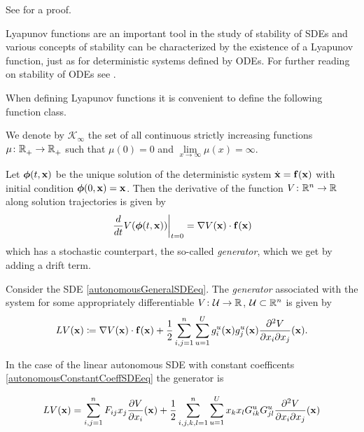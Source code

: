 \documentclass[a4paper,12pt,twoside,BCOR=10mm]{scrbook}
\begin{document}
See \citep{HGGS2018localLya} for a proof.

Lyapunov functions are an important tool in the study of stability of SDEs and various concepts of stability can be characterized by the existence of a Lyapunov function, just as for deterministic systems defined by ODEs. For further reading on stability of ODEs see \citep{Hahn1967, vidya2002, Khalil1992, sastry1999}.

When defining Lyapunov functions it is convenient to define the following function class.

\begin{definition}
    We denote by $\mathcal{K}_\infty$ the set of all continuous strictly increasing functions $\mu\colon \mathbb{R}^{}_+ \to \mathbb{R}^{}_+$ such that $\mu(0) = 0$ and $\lim\limits_{x \to \infty} \mu(x) = \infty$.
\end{definition}

Let $\bm{\phi}(t,\mathbf{x})$ be the unique solution of the deterministic system $\Dot{\mathbf{x}} = \mathbf{f}(\mathbf{x})$ with initial condition $\bm{\phi}(0, \mathbf{x}) = \mathbf{x}$. Then the derivative of the function $V \colon \mathbb{R}^{n} \to \mathbb{R}^{}$ along solution trajectories is given by
\begin{align*}
    \left. \frac{d}{dt}V(\bm{\phi}(t,\mathbf{x}))\right\rvert_{t = 0} = \nabla V(\mathbf{x})\cdot \mathbf{f}(\mathbf{x})
\end{align*}
which has a stochastic counterpart, the so-called \textit{generator}, which we get by adding a drift term.

\begin{definition}
    Consider the SDE \eqref{autonomousGeneralSDEeq}. The \textit{generator} associated with the system for some appropriately differentiable $V \colon \mathcal{U} \to \mathbb{R}^{}$, $\mathcal{U} \subset \mathbb{R}^{n}$ is given by
    \begin{align}
        LV(\mathbf{x}) \coloneqq \nabla V(\mathbf{x})\cdot \mathbf{f}(\mathbf{x}) + \frac{1}{2}\sum\limits_{i,j = 1}^n\sum\limits_{u = 1}^U g_i^u(\mathbf{x}) g_j^u(\mathbf{x}) \frac{\partial^2 V}{\partial x_i \partial x_j}(\mathbf{x}).
    \end{align}
\end{definition}

In the case of the linear autonomous SDE with constant coefficents \eqref{autonomousConstantCoeffSDEeq} the generator is

\begin{align}
    LV(\mathbf{x}) = \sum\limits_{i,j = 1}^nF_{ij}x_j\frac{\partial V}{\partial x_i}(\mathbf{x}) + \frac{1}{2}\sum\limits_{i,j,k,l = 1}^n\sum\limits_{u = 1}^Ux_k x_l G_{ik}^u G_{jl}^u \frac{\partial^2 V}{\partial x_i \partial x_j}(\mathbf{x})
\end{align}
\end{document}

